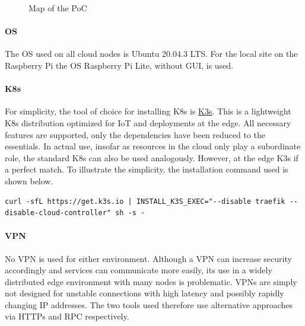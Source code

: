 \documentclass[MSC,Master,english]{twbook}%
\begin{document}
\begin{figure}[ht]
    \centering
    \caption{Map of the \ac{PoC}\cite{googlemaps}}
    \label{fig:poc-map}
\end{figure}

\paragraph{OS} The \ac{OS} used on all cloud nodes is Ubuntu 20.04.3 LTS. For the local site on the Raspberry Pi the \ac{OS} Raspberry Pi Lite, without \ac{GUI}, is used.

\paragraph{\ac{K8s}} For simplicity, the tool of choice for installing \ac{K8s} is \hyperref{https://k3s.io/}{}{}{K3s}. This is a lightweight \ac{K8s} distribution optimized for \ac{IoT} and deployments at the edge. All necessary features are supported, only the dependencies have been reduced to the essentials. In actual use, insofar as resources in the cloud only play a subordinate role, the standard \ac{K8s} can also be used analogously. However, at the edge K3s if a perfect match. To illustrate the simplicity, the installation command used is shown below.  

\begin{lstlisting}[caption={K3s installation},captionpos=b]
curl -sfL https://get.k3s.io | INSTALL_K3S_EXEC="--disable traefik --disable-cloud-controller" sh -s -
\end{lstlisting}

\paragraph{VPN} No \ac{VPN} is used for either environment. Although a VPN can increase security accordingly and services can communicate more easily, its use in a widely distributed edge environment with many nodes is problematic. VPNs are simply not designed for unstable connections with high latency and possibly rapidly changing \ac{IP} addresses. The two tools used therefore use alternative approaches via HTTPs and RPC respectively.
\end{document}
